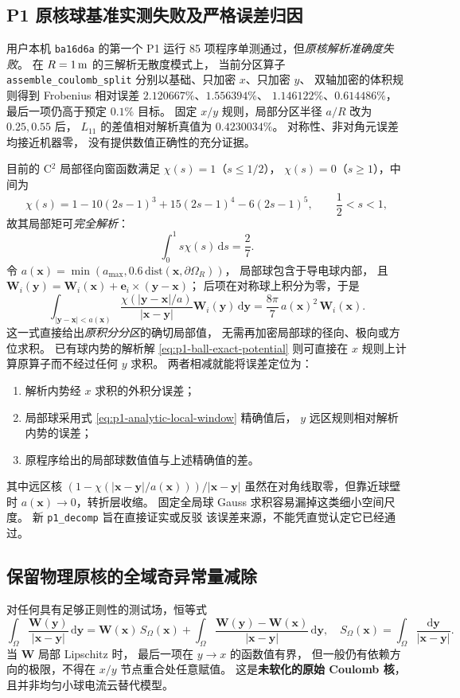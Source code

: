 \subsection{P1 原核球基准实测失败及严格误差归因}
用户本机 \texttt{ba16d6a} 的第一个 P1 运行
85 项程序单测通过，但\emph{原核解析准确度失败}。
在 $R=1\,{\rm m}$ 的三解析无散度模式上，
当前分区算子 \texttt{assemble\_coulomb\_split}
分别以基础、只加密 $x$、只加密 $y$、
双轴加密的体积规则得到 Frobenius 相对误差
$2.120667\%$、$1.556394\%$、
$1.146122\%$、$0.614486\%$，
最后一项仍高于预定 $0.1\%$ 目标。
固定 $x/y$ 规则，局部分区半径 $a/R$
改为 $0.25,0.55$ 后，
$L_{11}$ 的差值相对解析真值为 $0.4230034\%$。
对称性、非对角元误差均接近机器零，
没有提供数值正确性的充分证据。

目前的 C$^2$ 局部径向窗函数满足
$\chi(s)=1$（$s\le1/2$），
$\chi(s)=0$（$s\ge1$），中间为
\[
\chi(s)=1-10(2s-1)^3+15(2s-1)^4-6(2s-1)^5,
\qquad \frac12<s<1,
\]
故其局部矩可\emph{完全解析}：
\[
\int_0^1 s\chi(s)\,\mathrm ds=\frac27 .
\]
令 $a(\bm x)=
\min(a_{\max},0.6\,\mathrm{dist}(\bm x,\partial\Omega_R))$，
局部球包含于导电球内部，
且 $\bm W_i(\bm y)=
\bm W_i(\bm x)+\bm e_i\times(\bm y-\bm x)$；
后项在对称球上积分为零，于是
\begin{equation}
\boxed{
\int_{|\bm y-\bm x|<a(\bm x)}
\frac{\chi(|\bm y-\bm x|/a)}
{|\bm x-\bm y|}\bm W_i(\bm y)\,\mathrm d\bm y
=\frac{8\pi}{7}\,a(\bm x)^2\,\bm W_i(\bm x).
}
\label{eq:p1-analytic-local-window}
\end{equation}
这一式直接给出\emph{原积分分区}的确切局部值，
无需再加密局部球的径向、极向或方位求积。
已有球内势的解析解
\eqref{eq:p1-ball-exact-potential} 则可直接在
$x$ 规则上计算原算子而不经过任何 $y$ 求积。
两者相减就能将误差定位为：
\begin{enumerate}
\item 解析内势经 $x$ 求积的外积分误差；
\item 局部球采用式
\eqref{eq:p1-analytic-local-window} 精确值后，
$y$ 远区规则相对解析内势的误差；
\item 原程序给出的局部球数值值与上述精确值的差。
\end{enumerate}
其中远区核
$(1-\chi(|\bm x-\bm y|/a(\bm x)))/|\bm x-\bm y|$
虽然在对角线取零，但靠近球壁时
$a(\bm x)\to0$，转折层收缩。
固定全局球 Gauss 求积容易漏掉这类细小空间尺度。
新 \texttt{p1\_decomp} 旨在直接证实或反驳
该误差来源，不能凭直觉认定它已经通过。

\subsection{保留物理原核的全域奇异常量减除}
对任何具有足够正则性的测试场，恒等式
\begin{equation}
\boxed{
\int_\Omega\frac{\bm W(\bm y)}{|\bm x-\bm y|}
\,\mathrm d\bm y
=\bm W(\bm x)\,S_\Omega(\bm x)
+\int_\Omega
\frac{\bm W(\bm y)-\bm W(\bm x)}{|\bm x-\bm y|}
\,\mathrm d\bm y,
\quad
S_\Omega(\bm x)=\int_\Omega
\frac{\mathrm d\bm y}{|\bm x-\bm y|}.
}
\label{eq:p1-global-constant-subtraction}
\end{equation}
当 $\bm W$ 局部 Lipschitz 时，
最后一项在 $y\to x$ 的函数值有界，
但一般仍有依赖方向的极限，不得在
$x/y$ 节点重合处任意赋值。
这是\textbf{未软化的原始 Coulomb 核}，
且并非均匀小球电流云替代模型。

